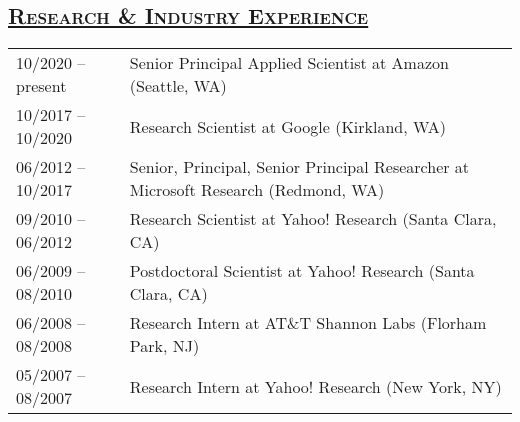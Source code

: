 \documentclass[10pt,twoside,letterpaper]{article}
\newcommand{\tabrowsep}{\vspace{1mm}}
\begin{document}
\subsection*{\textsc{\underline{Research \& Industry Experience}}}

\begin{tabular}{p{30mm} p{120mm}}
10/2020 -- present & Senior Principal Applied Scientist at Amazon (Seattle, WA) \\
10/2017 -- 10/2020 & Research Scientist at Google (Kirkland, WA) \\
06/2012 -- 10/2017 & Senior, Principal, Senior Principal Researcher at Microsoft Research (Redmond, WA) \\
09/2010 -- 06/2012 & Research Scientist at Yahoo! Research (Santa Clara, CA) \\
06/2009 -- 08/2010 & Postdoctoral Scientist at Yahoo! Research (Santa Clara, CA) \\
06/2008 -- 08/2008 & Research Intern at AT\&T Shannon Labs (Florham Park, NJ) \\
05/2007 -- 08/2007 & Research Intern at Yahoo! Research (New York, NY) \\

\end{tabular}
\end{document}
